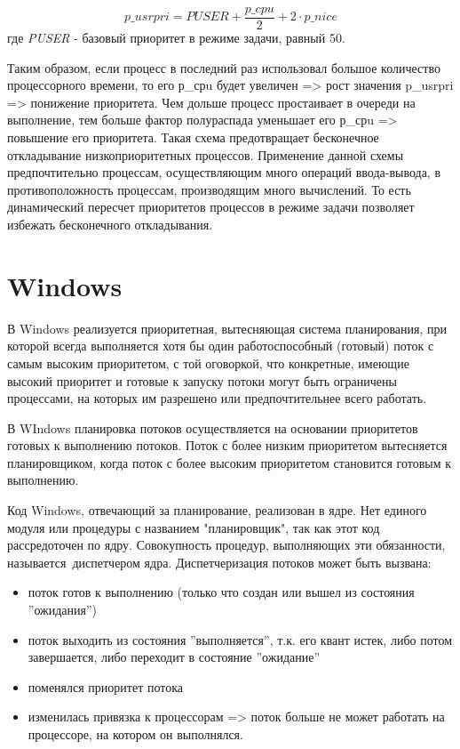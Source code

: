 \begin{equation}
\label{eq:ref2}
p\_usrpri = PUSER + \frac{p\_cpu}{2} + 2 \cdot p\_nice
\end{equation}где \textit{PUSER} - базовый приоритет в режиме задачи, равный 50.

Таким образом, если процесс в последний раз использовал большое количество процессорного времени, то его р\_срu будет увеличен => рост значения p\_usrpri => понижение приоритета.  Чем дольше процесс простаивает в очереди на выполнение, тем больше фактор полураспада уменьшает его р\_срu => повышение его приоритета. Такая схема предотвращает бесконечное откладывание низкоприоритетных процессов. Применение данной схемы предпочтительно процессам, осуществляющим много операций ввода-вывода, в противоположность процессам, производящим много вычислений. То есть динамический пересчет приоритетов процессов в режиме задачи позволяет избежать бесконечного откладывания.


\section{Windows}

В Windows реализуется приоритетная, вытесняющая система планирования, при которой всегда выполняется хотя бы один работоспособный (готовый) поток с самым высоким приоритетом, с той оговоркой, что конкретные, имеющие высокий приоритет и готовые к запуску потоки могут быть ограничены процессами, на ко­торых им разрешено или предпочтительнее всего работать. \cite{wind}

В WIndows планировка потоков осуществляется на основании приоритетов готовых к выполнению потоков. Поток с более низким приоритетом вытесняется планировщиком, когда поток с более высоким приоритетом становится готовым к выполнению.

Код Windows, отвечающий за планирование, реализован в ядре. Нет единого модуля или процедуры с названием "планировщик", так как этот код рассредоточен по ядру. Совокупность процедур, выполняющих эти обязанности, называется диспетчером ядра. Диспетчеризация потоков может быть вызвана:
\begin{itemize}
	\item поток готов к выполнению (только что создан или вышел из состояния ''ожидания'')
	\item поток выходить из состояния ''выполняется'', т.к. его квант истек, либо потом завершается, либо переходит в состояние ''ожидание''
	\item поменялся приоритет потока
	\item изменилась привязка к процессорам => поток больше не может работать на процессоре, на котором он выполнялся. 
\end{itemize}



